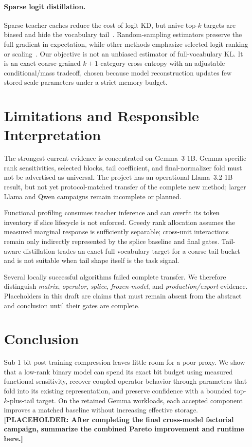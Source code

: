 \documentclass[10pt]{article}
\newcommand{\placeholder}[1]{\textcolor{red!70!black}{\textbf{[PLACEHOLDER: #1]}}}
\begin{document}
\paragraph{Sparse logit distillation.}
Sparse teacher caches reduce the cost of logit KD, but naive top-$k$ targets
are biased and hide the vocabulary tail~\cite{sparsekd2025}. Random-sampling
estimators preserve the full gradient in expectation, while other methods
emphasize selected logit ranking or scaling~\cite{topkd2025}. Our objective is
not an unbiased estimator of full-vocabulary KL. It is an exact coarse-grained
$k+1$-category cross entropy with an adjustable conditional/mass tradeoff,
chosen because model reconstruction updates few stored scale parameters under
a strict memory budget.

\section{Limitations and Responsible Interpretation}

The strongest current evidence is concentrated on Gemma~3 1B. Gemma-specific
rank sensitivities, selected blocks, tail coefficient, and final-normalizer
fold must not be advertised as universal. The project has an operational
Llama~3.2 1B result, but not yet protocol-matched transfer of the complete new
method; larger Llama and Qwen campaigns remain incomplete or planned.

Functional profiling consumes teacher inference and can overfit its token
inventory if slice lifecycle is not enforced. Greedy rank allocation assumes
the measured marginal response is sufficiently separable; cross-unit
interactions remain only indirectly represented by the splice baseline and
final gates. Tail-aware distillation trades an exact full-vocabulary target
for a coarse tail bucket and is not suitable when tail shape itself is the
task signal.

Several locally successful algorithms failed complete transfer. We therefore
distinguish \emph{matrix}, \emph{operator}, \emph{splice}, \emph{frozen-model},
and \emph{production/export} evidence. Placeholders in this draft are claims
that must remain absent from the abstract and conclusion until their gates are
complete.

\section{Conclusion}

Sub-1-bit post-training compression leaves little room for a poor proxy. We
show that a low-rank binary model can spend its exact bit budget using measured
functional sensitivity, recover coupled operator behavior through parameters
that fold into its existing representation, and preserve confidence with a
bounded top-$k$-plus-tail target. On the retained Gemma workloads, each
accepted component improves a matched baseline without increasing effective
storage. \placeholder{After completing the final cross-model factorial
campaign, summarize the combined Pareto improvement and runtime here.}
\end{document}
